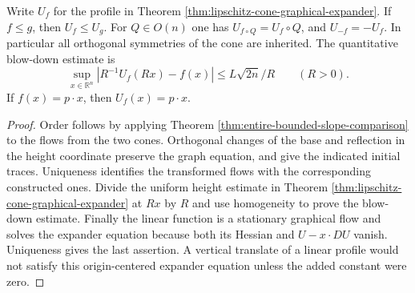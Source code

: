 \begin{proposition}\label{prop:cone-expander-order-symmetry}
Write $U_f$ for the profile in Theorem \ref{thm:lipschitz-cone-graphical-expander}. If $f\leq g$, then $U_f\leq U_g$. For $Q\in O(n)$ one has $U_{f\circ Q}=U_f\circ Q$, and $U_{-f}=-U_f$. In particular all orthogonal symmetries of the cone are inherited. The quantitative blow-down estimate is
\[
 \sup_{x\in\mathbb R^n}|R^{-1}U_f(Rx)-f(x)|
       \leq L\sqrt{2n}/R\qquad(R>0).
\]
If $f(x)=p\cdot x$, then $U_f(x)=p\cdot x$.
\end{proposition}
\begin{proof}
Order follows by applying Theorem \ref{thm:entire-bounded-slope-comparison} to the flows from the two cones. Orthogonal changes of the base and reflection in the height coordinate preserve the graph equation, and give the indicated initial traces. Uniqueness identifies the transformed flows with the corresponding constructed ones. Divide the uniform height estimate in Theorem \ref{thm:lipschitz-cone-graphical-expander} at $Rx$ by $R$ and use homogeneity to prove the blow-down estimate. Finally the linear function is a stationary graphical flow and solves the expander equation because both its Hessian and $U-x\cdot DU$ vanish. Uniqueness gives the last assertion. A vertical translate of a linear profile would not satisfy this origin-centered expander equation unless the added constant were zero.
\end{proof}

